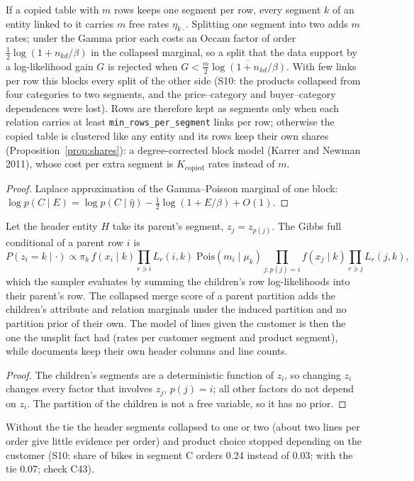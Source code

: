 \begin{proposition}\label{prop:perrow}
If a copied table with $m$ rows keeps one segment per row, every segment $k$ of an entity linked to it carries $m$ free rates $\eta_{k\cdot}$. Splitting one segment into two adds $m$ rates; under the Gamma prior each costs an Occam factor of order $\tfrac12\log(1+n_{kd}/\beta)$ in the collapsed marginal, so a split that the data support by a log-likelihood gain $G$ is rejected when $G<\tfrac m2\overline{\log(1+n_{kd}/\beta)}$. With few links per row this blocks every split of the other side (S10: the products collapsed from four categories to two segments, and the price--category and buyer--category dependences were lost). Rows are therefore kept as segments only when each relation carries at least \texttt{min\_rows\_per\_segment} links per row; otherwise the copied table is clustered like any entity and its rows keep their own shares (Proposition~\ref{prop:shares}): a degree-corrected block model (Karrer and Newman 2011), whose cost per extra segment is $K_{\mathrm{copied}}$ rates instead of $m$.
\end{proposition}
\begin{proof}
Laplace approximation of the Gamma--Poisson marginal of one block: $\log p(C\mid E)=\log p(C\mid\hat\eta)-\tfrac12\log(1+E/\beta)+O(1)$.
\end{proof}

\begin{proposition}\label{prop:tied}
Let the header entity $H$ take its parent's segment, $z_j=z_{p(j)}$. The Gibbs full conditional of a parent row $i$ is
\[ P(z_i=k\mid\cdot)\propto\pi_k\,f(x_i\mid k)\prod_{r\ni i}L_r(i,k)\;\mathrm{Pois}(m_i\mid\mu_k)\prod_{j:p(j)=i}f(x_j\mid k)\prod_{r\ni j}L_r(j,k), \]
which the sampler evaluates by summing the children's row log-likelihoods into their parent's row. The collapsed merge score of a parent partition adds the children's attribute and relation marginals under the induced partition and no partition prior of their own. The model of lines given the customer is then the one the unsplit fact had (rates per customer segment and product segment), while documents keep their own header columns and line counts.
\end{proposition}
\begin{proof}
The children's segments are a deterministic function of $z_i$, so changing $z_i$ changes every factor that involves $z_j$, $p(j)=i$; all other factors do not depend on $z_i$. The partition of the children is not a free variable, so it has no prior.
\end{proof}
\noindent Without the tie the header segments collapsed to one or two (about two lines per order give little evidence per order) and product choice stopped depending on the customer (S10: share of bikes in segment C orders 0.24 instead of 0.03; with the tie 0.07; check C43).

